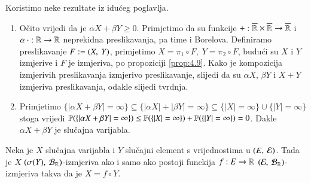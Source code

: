\begin{rj}[\ref{zad:3.19}]
    Koristimo neke rezultate iz idu\' ceg poglavlja.
    \begin{figure}[H]
        \centering
    \end{figure}
    \begin{enumerate}[label=(\alph*)]
        \item O\v cito vrijedi da je $\alpha X + \beta Y \geq 0$.
        Primjetimo da su funkcije $+ : \overline{\mathbb{R}} \times \overline{\mathbb{R}} \to \overline{\mathbb{R}}$ i $\alpha \: \cdot : \mathbb{R} \to \mathbb{R}$ neprekidna preslikavanja, pa time i Borelova.
        Definiramo preslikavanje $F := ({X}, \: {Y})$, primjetimo $X = \pi_1 \circ F, \; Y = \pi_2 \circ F$, budu\' ci su $X$ i $Y$ izmjerive i $F$ je izmjeriva, po propoziciji \ref{prop:4.9}.
        Kako je kompozicija izmjerivih preslikavanja izmjerivo preslikavanje, slijedi da su $\alpha X$, $\beta Y$ i $X + Y$ izmjeriva preslikavanja, odakle slijedi tvrdnja.
        \item Primjetimo $\{ | \alpha X + \beta Y | = \infty \} \subseteq \{ |\alpha X| + |\beta Y| = \infty \} \subseteq \{|X| = \infty\} \cup \{ |Y| = \infty \}$ stoga vrijedi $\mathbb{P}({ \{ | \alpha X + \beta Y | = \infty \} }) \leq \mathbb{P}({\{|X| = \infty\}}) + \mathbb{P}({\{|Y| = \infty\}}) = 0$.
        Dakle $\alpha X + \beta Y$ je slu\v cajna varijabla.
    \end{enumerate}
\end{rj}

\begin{zad} \label{zad:3.20}
    Neka je $X$ slu\v cajna varijabla i $Y$ slu\v cajni element s vrijednostima u $(E, \: \mathcal{E})$.
    Tada je $X$ $(\sigma({Y}), \: \mathcal{B}_{\mathbb{R}})$-izmjeriva ako i samo ako postoji funckija $f: E \to \mathbb{R}$ $(\mathcal{E}, \: \mathcal{B}_{\mathbb{R}})$-izmjeriva takva da je $X = f \circ Y$.
\end{zad}

